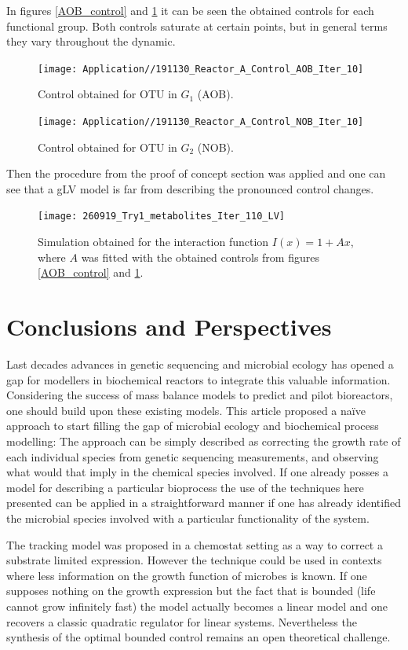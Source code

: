 \documentclass[3p,times]{elsarticle}
\begin{document}
In figures \ref{AOB_control} and \ref{NOB_control} it can be seen the obtained controls for each functional group. Both controls saturate at certain points, but in general terms they vary throughout the dynamic. 

\begin{figure}[h]
	\centering
	\texttt{[image: Application//191130\_Reactor\_A\_Control\_AOB\_Iter\_10]}
	\caption{Control obtained for OTU in $G_1$ (AOB).}
	\label{AOB_control}
	\texttt{[image: Application//191130\_Reactor\_A\_Control\_NOB\_Iter\_10]}
	\caption{Control obtained for OTU in $G_2$ (NOB).}
	\label{NOB_control}
\end{figure}

Then the procedure from the proof of concept section was applied and one can see that a gLV model is far from describing the pronounced control changes.

\begin{figure}[h]
	\centering
	\texttt{[image: 260919\_Try1\_metabolites\_Iter\_110\_LV]}
	\caption{Simulation obtained for the interaction function $I(x) = 1 + Ax$, where $A$ was fitted with the obtained controls from figures \ref{AOB_control} and \ref{NOB_control}.}
	\label{LV_fit}
\end{figure}
\clearpage
\section{Conclusions and Perspectives}

Last decades advances in genetic sequencing and microbial ecology has opened a gap for modellers in biochemical reactors to integrate this valuable information. Considering the success of mass balance models to predict and pilot bioreactors, one should build upon these existing models. This article proposed a naïve approach to start filling the gap of microbial ecology and biochemical process modelling: The approach can be simply described as correcting the growth rate of each individual species from genetic sequencing measurements, and observing what would that imply in the chemical species involved. If one already posses a model for describing a particular bioprocess the use of the techniques here presented can be applied in a straightforward manner if one has already identified the microbial species involved with a particular functionality of the system.

The tracking model was proposed  in a chemostat setting as a way to correct a substrate limited expression. However the technique could be used in contexts where less information on the growth function of microbes is known. If one supposes nothing on the growth expression but the fact that is bounded (life cannot grow infinitely fast) the model actually becomes a linear model and one recovers a classic quadratic regulator for linear systems. Nevertheless the synthesis of the optimal bounded control remains an open theoretical challenge.
\end{document}
